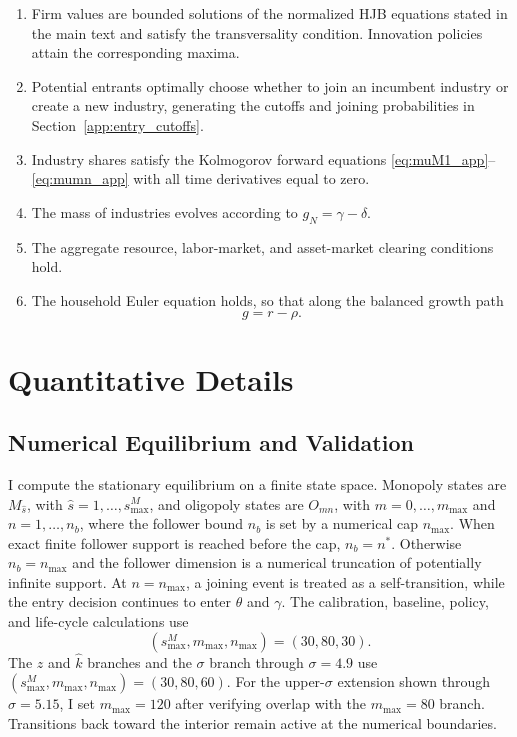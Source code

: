 \documentclass[12pt]{article}
\begin{document}
\begin{enumerate}
    \item Firm values are bounded solutions of the normalized HJB equations stated in the main text and satisfy the transversality condition. Innovation policies attain the corresponding maxima.
    \item Potential entrants optimally choose whether to join an incumbent industry or create a new industry, generating the cutoffs and joining probabilities in Section~\ref{app:entry_cutoffs}.
    \item Industry shares satisfy the Kolmogorov forward equations \eqref{eq:muM1_app}--\eqref{eq:mumn_app} with all time derivatives equal to zero.
    \item The mass of industries evolves according to \(g_N=\gamma-\delta\).
    \item The aggregate resource, labor-market, and asset-market clearing conditions hold.
    \item The household Euler equation holds, so that along the balanced growth path
    \[
    g=r-\rho.
    \]
\end{enumerate}

\section{Quantitative Details}

\subsection{Numerical Equilibrium and Validation}

I compute the stationary equilibrium on a finite state space. Monopoly states are \(M_{\hat s}\), with \(\hat s=1,\ldots,s_{\max}^M\), and oligopoly states are \(O_{mn}\), with \(m=0,\ldots,m_{\max}\) and \(n=1,\ldots,n_b\), where the follower bound \(n_b\) is set by a numerical cap \(n_{\max}\). When exact finite follower support is reached before the cap, \(n_b=n^*\). Otherwise \(n_b=n_{\max}\) and the follower dimension is a numerical truncation of potentially infinite support. At \(n=n_{\max}\), a joining event is treated as a self-transition, while the entry decision continues to enter \(\theta\) and \(\gamma\). The calibration, baseline, policy, and life-cycle calculations use
\[
(s_{\max}^M,m_{\max},n_{\max})=(30,80,30).
\]
The \(z\) and \(\hat{k}\) branches and the \(\sigma\) branch through \(\sigma=4.9\) use \((s_{\max}^M,m_{\max},n_{\max})=(30,80,60)\). For the upper-\(\sigma\) extension shown through \(\sigma=5.15\), I set \(m_{\max}=120\) after verifying overlap with the \(m_{\max}=80\) branch. Transitions back toward the interior remain active at the numerical boundaries.
\end{document}
